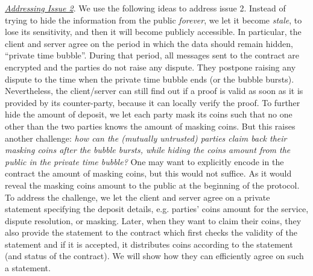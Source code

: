 \noindent\underline{\textit{Addressing Issue 2}}. We use the following ideas to address issue 2. Instead of trying to hide the information from the public \emph{forever}, we let it become \emph{stale}, to lose its sensitivity, and then it will become publicly accessible. In particular, the client and server agree on the period in which the data should remain hidden, ``private time bubble''. During that period, all messages sent to the contract are encrypted and the parties do not raise any dispute. They postpone raising any dispute to the time when the private time bubble ends (or the bubble bursts). Nevertheless, the client/server can still find out if a proof is valid as soon as it is provided by its counter-party, because it can locally verify the proof.  To further hide the amount of deposit, we let each party  mask its coins such that no one other than the two parties knows the amount of masking coins.  But this raises another challenge: \textit{how can the (mutually untrusted) parties claim back their masking coins after the bubble bursts, while hiding the coins amount from the public in the private time bubble?} One may want to  explicitly encode in the contract the amount of masking coins, but this would not suffice. As it would reveal the masking coins amount to the public at the beginning of the protocol. To address the challenge, we let the client and server  agree on a private statement specifying the deposit details, e.g. parties' coins amount for the service, dispute resolution, or masking. Later, when they want to claim their coins, they also provide the statement to the contract which first  checks the validity of the statement and if it is accepted, it distributes coins according to the statement (and status of the contract). We will show how they can  efficiently agree on such a statement.
 
 
 
 
